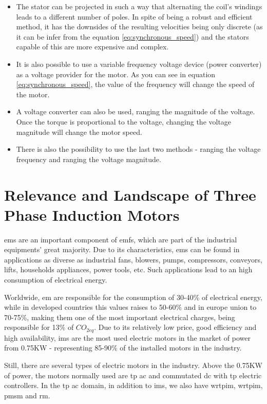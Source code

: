 \begin{itemize}
  \item 
  The stator can be projected in such a way that alternating the coil's windings leads to a different number of poles. In spite of being a robust and efficient method, it has the downsides of the resulting velocities being only discrete (as it can be infer from the equation \ref{eq:synchronous_speed}) and the stators capable of this are more expensive and complex. 
  \item 
  It is also possible to use a variable frequency voltage device (power converter) as a voltage provider for the motor. As you can see in equation \ref{eq:synchronous_speed}, the value of the frequency will change the speed of the motor.
  \item 
  A voltage converter can also be used, ranging the magnitude of the voltage. Once the torque is proportional to the voltage, changing the voltage magnitude will change the motor speed.
  \item 
  There is also the possibility to use the last two methods - ranging the voltage frequency and ranging the voltage magnitude.
\end{itemize}

\section{Relevance and Landscape of Three Phase Induction Motors} %
\label{sec:tpin_relevance}

\acrshort{em}s are an important component of \acrshort{emfs}, which are part of the industrial equipments' great majority. Due to its characteristics, \acrshort{em}s can be found in applications as diverse as industrial fans, blowers, pumps, compressors, conveyors, lifts, households appliances, power tools, etc. 
Such applications lead to an high consumption of electrical energy.

Worldwide, \acrshort{em} are responsible for the consumption of 30-40\% of electrical energy, while in developed countries this values raises to 50-60\% and in europe union to 70-75\%, making them one of the most important electrical charges, being responsible for 13\% of $CO_{2eq}$. 
Due to its relatively low price, good efficiency and high availability, \acrshort{ims}  are the most used electric motors in the market of power from 0.75KW - representing 85-90\% of the installed motors in the industry. 

Still, there are several types of electric motors in the industry. Above the 0.75KW of power, the motors normally used are \acrshort{tp} \acrshort{ac} and commutated \acrshort{dc} with \acrshort{tp} electric controllers.
In the \acrshort{tp} \acrshort{ac} domain, in addition to \acrshort{ims}, we also have \acrfull{wrtpim}, \acrfull{wrtpim}, \acrfull{pmsm} and \acrfull{rm}. 

